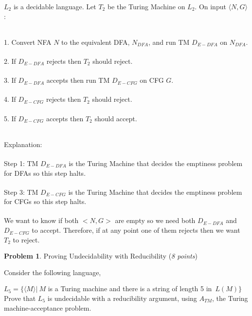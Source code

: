 \documentclass[11pt]{article}
\theoremstyle{definition}
\theoremstyle{theorem}
\newtheorem{prob}{Problem}
\begin{document}
\begin{enumerate}[label=(\alph*)]
$L_2$ is a decidable language. Let $T_2$ be the Turing Machine on $L_2$. On input $\langle N, G \rangle$: \\~\\
\begin{minipage}{.9\textwidth}
	1. Convert NFA $N$ to the equivalent DFA, $N_{DFA}$, and run TM $D_{E-DFA}$ on $N_{DFA}$. \\~\\
	2. If $D_{E-DFA}$ rejects then $T_2$ should reject. \\~\\
	3. If $D_{E-DFA}$ accepts then run TM $D_{E-CFG}$ on CFG $G$. \\~\\
	4. If $D_{E-CFG}$ rejects then $T_2$ should reject. \\~\\
	5. If $D_{E-CFG}$ accepts then $T_2$ should accept. \\~\\
\end{minipage}

Explanation:\\~\\
Step 1: TM $D_{E-DFA}$ is the Turing Machine that decides the emptiness problem for DFAs so this step halts. \\~\\
Step 3: TM $D_{E-CFG}$ is the Turing Machine that decides the emptiness problem for CFGs so this step halts. \\~\\
We want to know if both $<N, G>$ are empty so we need both $D_{E-DFA}$ and $D_{E-CFG}$ to accept. Therefore, if at any point one of them rejects then we want $T_2$ to reject.









\end{enumerate}


\newpage

\begin{prob} Proving Undecidability with Reducibility (\emph{8 points})\end{prob}

Consider the following language, 

$L_{5} = \{\langle M \rangle | ~M $  is a Turing machine and there is a string of length 5 in~$ L(M)\}$\\

Prove that $L_{5}$ is undecidable with a reducibility argument, using $A_{TM}$, the Turing machine-acceptance problem.
\end{document}
